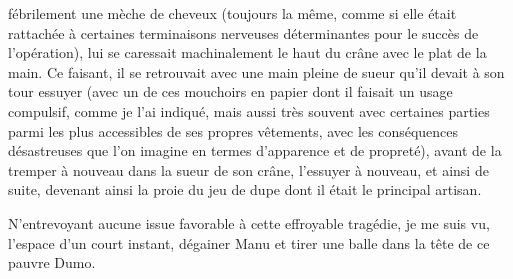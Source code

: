 fébrilement une mèche de cheveux (toujours la même, comme si elle était rattachée à certaines terminaisons nerveuses déterminantes pour le succès de l’opération), lui se caressait machinalement le haut du crâne avec le plat de la main. Ce faisant, il se retrouvait avec une main pleine de sueur qu’il devait à son tour essuyer (avec un de ces mouchoirs en papier dont il faisait un usage compulsif, comme je l’ai indiqué, mais aussi très souvent avec certaines parties parmi les plus accessibles de ses propres vêtements, avec les conséquences désastreuses que l’on imagine en termes d’apparence et de propreté), avant de la tremper à nouveau dans la sueur de son crâne, l’essuyer à nouveau, et ainsi de suite, devenant ainsi la proie du jeu de dupe dont il était le principal artisan.

N’entrevoyant aucune issue favorable à cette effroyable tragédie, je me suis vu, l’espace d’un court instant, dégainer Manu et tirer une balle dans la tête de ce pauvre Dumo.

